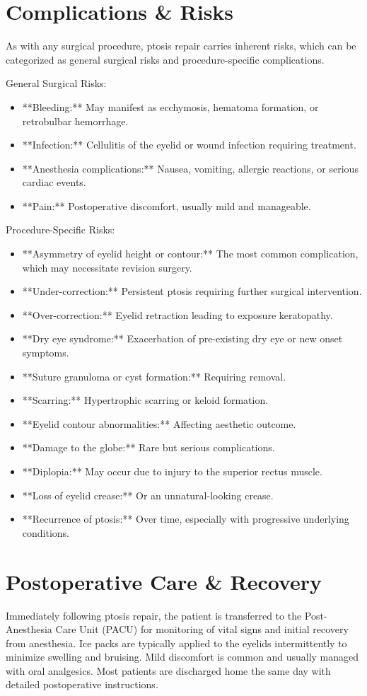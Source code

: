 \section*{Complications \& Risks}
As with any surgical procedure, ptosis repair carries inherent risks, which can be categorized as general surgical risks and procedure-specific complications.

General Surgical Risks:
\begin{itemize}
  \item **Bleeding:** May manifest as ecchymosis, hematoma formation, or retrobulbar hemorrhage.
  \item **Infection:** Cellulitis of the eyelid or wound infection requiring treatment.
  \item **Anesthesia complications:** Nausea, vomiting, allergic reactions, or serious cardiac events.
  \item **Pain:** Postoperative discomfort, usually mild and manageable.
\end{itemize}

Procedure-Specific Risks:
\begin{itemize}
  \item **Asymmetry of eyelid height or contour:** The most common complication, which may necessitate revision surgery.
  \item **Under-correction:** Persistent ptosis requiring further surgical intervention.
  \item **Over-correction:** Eyelid retraction leading to exposure keratopathy.
  \item **Dry eye syndrome:** Exacerbation of pre-existing dry eye or new onset symptoms.
  \item **Suture granuloma or cyst formation:** Requiring removal.
  \item **Scarring:** Hypertrophic scarring or keloid formation.
  \item **Eyelid contour abnormalities:** Affecting aesthetic outcome.
  \item **Damage to the globe:** Rare but serious complications.
  \item **Diplopia:** May occur due to injury to the superior rectus muscle.
  \item **Loss of eyelid crease:** Or an unnatural-looking crease.
  \item **Recurrence of ptosis:** Over time, especially with progressive underlying conditions.
\end{itemize}

\section*{Postoperative Care \& Recovery}
Immediately following ptosis repair, the patient is transferred to the Post-Anesthesia Care Unit (PACU) for monitoring of vital signs and initial recovery from anesthesia. Ice packs are typically applied to the eyelids intermittently to minimize swelling and bruising. Mild discomfort is common and usually managed with oral analgesics. Most patients are discharged home the same day with detailed postoperative instructions.

